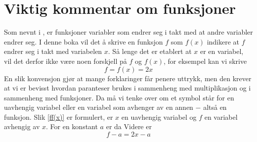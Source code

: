





\section*{Viktig kommentar om funksjoner}
Som nevnt i \mb, er funksjoner variabler som endrer seg i takt med at andre variabler endrer seg. I denne boka vil det å skrive en funksjon $ f $ som $ f(x) $ indikere at $ f $ endrer seg i takt med variabelen $ x $. Så lenge det er etablert at $ x $ er en variabel, vil det derfor ikke være noen forskjell på $ f $ og $ f(x)$, for eksempel kan vi skrive
\begin{equation}\label{ff(x)}
	f=f(x)=2x	
\end{equation} 
En slik konvensjon gjør at mange forklaringer får penere uttrykk, men den krever at vi er bevisst hvordan paranteser brukes i sammenheng med multiplikasjon og i sammenheng med funksjoner. Da må vi tenke over om et symbol står for en uavhengig variabel eller en variabel som avhenger av en annen $ - $ altså en funksjon. Slik \eqref{ff(x)} er formulert, er $ x $ en uavhengig variabel og $ f $ en variabel avhengig av $ x $. For en konstant $ a $ er da
Videre er
\[ f-a=2x-a \]
